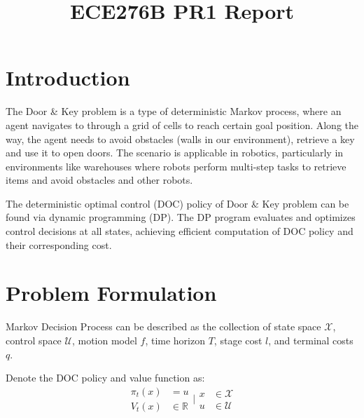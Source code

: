 \documentclass[conference]{IEEEtran}
\begin{document}
\title{ECE276B PR1 Report}

\author{
}

\maketitle


\section{Introduction}
The Door \& Key problem is a type of deterministic Markov process,
where an agent navigates to through a grid of cells to reach certain goal position.
Along the way, the agent needs to avoid obstacles (walls in our environment), retrieve a key and use it to open doors.
The scenario is applicable in robotics, particularly in environments like warehouses 
where robots perform multi-step tasks to retrieve items and avoid obstacles and other robots.

The deterministic optimal control (DOC) policy of Door \& Key problem can be 
found via dynamic programming (DP).
The DP program evaluates and optimizes control decisions at all states,
achieving efficient computation of DOC policy 
and their corresponding cost.


\section{Problem Formulation}
Markov Decision Process can be described as the collection of 
state space $\mathcal{X}$, control space $\mathcal{U}$, 
motion model $f$, time horizon $T$, stage cost $l$, and terminal costs $q$. 

Denote the DOC policy and value function as:
$$
\begin{aligned}
    \pi_{t} (x)&=u\\ 
    V_{t}(x)&\in \mathbb{R}
\end{aligned} 
\bigg|
\begin{aligned}
    x&\in \mathcal{X}\\ 
    u&\in \mathcal{U}
\end{aligned} 
$$
\end{document}
